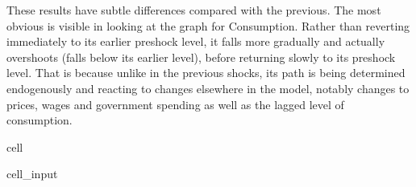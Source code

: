 \documentclass[letterpaper,10pt,english]{jupyterBook}
\begin{document}
\sphinxAtStartPar
These results have subtle differences compared with the previous.  The most obvious is visible in looking at the graph for Consumption.  Rather than reverting immediately to its earlier pre\sphinxhyphen{}shock level, it falls more gradually and actually overshoots (falls below its earlier level), before returning slowly to its pre\sphinxhyphen{}shock level.  That is because unlike in the previous shocks, its path is being determined endogenously and reacting to changes elsewhere in the model, notably changes to prices, wages and government spending as well as the lagged level of consumption.

\begin{sphinxuseclass}{cell}\begin{sphinxVerbatimInput}

\begin{sphinxuseclass}{cell_input}
\begin{sphinxVerbatim}[commandchars=\\\{\}]


\end{sphinxVerbatim}
\end{sphinxuseclass}
\end{sphinxVerbatimInput}
\end{sphinxuseclass}
\end{document}
